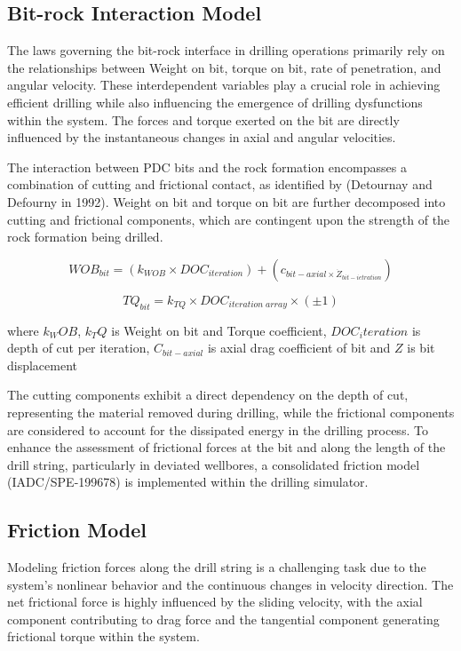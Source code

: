 \subsection{Bit-rock Interaction Model}

The laws governing the bit-rock interface in drilling operations primarily rely on the relationships between Weight on bit, torque on bit, rate of penetration, and angular velocity. These interdependent variables play a crucial role in achieving efficient drilling while also influencing the emergence of drilling dysfunctions within the system. The forces and torque exerted on the bit are directly influenced by the instantaneous changes in axial and angular velocities.

The interaction between PDC bits and the rock formation encompasses a combination of cutting and frictional contact, as identified by (Detournay and Defourny in 1992). Weight on bit and torque on bit are further decomposed into cutting and frictional components, which are contingent upon the strength of the rock formation being drilled.

\begin{equation}\label{WOB}
  WOB_{bit} = (k_{WOB}\times DOC_{iteration}) + (c_{bit-axial\times \dot{Z}_{bit-ietration}})
\end{equation}

\begin{equation}\label{Torque}
  TQ_{bit} = k_{TQ}\times DOC_{iteration\; array}\times (\pm1)
\end{equation}

where $k_WOB$, $k_TQ$ is Weight on bit and Torque coefficient, $DOC_iteration$ is depth of cut per iteration, $C_{bit-axial}$ is axial drag coefficient of bit and $Z$ is bit displacement 

The cutting components exhibit a direct dependency on the depth of cut, representing the material removed during drilling, while the frictional components are considered to account for the dissipated energy in the drilling process. To enhance the assessment of frictional forces at the bit and along the length of the drill string, particularly in deviated wellbores, a consolidated friction model (IADC/SPE-199678) is implemented within the drilling simulator. 

\subsection{Friction Model}

Modeling friction forces along the drill string is a challenging task due to the system's nonlinear behavior and the continuous changes in velocity direction. The net frictional force is highly influenced by the sliding velocity, with the axial component contributing to drag force and the tangential component generating frictional torque within the system.
 
